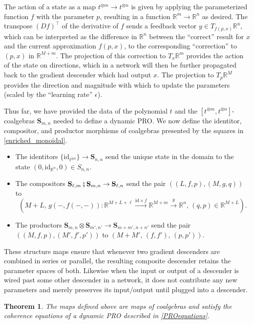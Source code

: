 \documentclass[11pt, one side, article]{memoir}
\theoremstyle{definition}
\theoremstyle{plain}
\newtheorem{theorem}[definitionx]{Theorem}
\newcommand{\Cat}[1]{\mathbf{#1}}%
\newcommand{\id}{\mathrm{id}}
\newcommand{\then}{\mathbin{\fatsemi}}
\newcommand{\To}[2][]{\xrightarrow[#1]{#2}}
\newcommand{\rr}{\mathbb{R}}
\newcommand{\0}{\textsf{0}}
\newcommand{\1}{\tn{\textsf{1}}}
\renewcommand{\S}{{\Cat{S}}}
\newcommand{\idcoalg}[1]{{\{\id_{#1}\}}}
\begin{document}
The action of a state as a map $t^{\otimes m} \to t^{\otimes n}$ is given by applying the parameterized function $f$ with the parameter $p$, resulting in a function $\rr^m \to \rr^n$ as desired. The transpose $(Df)^\top$ of the derivative of $f$ sends a feedback vector $y \in T_{f(p,x)} \rr^n$, which can be interpreted as the difference in $\rr^n$ between the ``correct'' result for $x$ and the current approximation $f(p,x)$, to the corresponding ``correction'' to $(p,x)$ in $\rr^{M+m}$. The projection of this correction to $T_x \rr^m$ provides the action of the state on directions, which in a network will then be further propagated back to the gradient descender which had output $x$. The projection to $T_p \rr^M$ provides the direction and magnitude with which to update the parameters (scaled by the ``learning rate'' $\epsilon$).

Thus far, we have provided the data of the polynomial $t$ and the $[t^{\otimes m},t^{\otimes n}]$-coalgebras $\S_{m,n}$ needed to define a dynamic PRO. We now define the identitor, compositor, and productor morphisms of coalgebras presented by the squares in \cref{enriched_monoidal}.
\begin{itemize}
	\item The identitors $\idcoalg{t^{\otimes n}} \to \S_{n,n}$ send the unique state in the domain to the state $(0,\id_{\rr^n},0) \in S_{n,n}$. 
	\item The compositors $\S_{\ell,m}\then\S_{m,n} \to \S_{\ell,n}$ send the pair $((L,f,p),(M,g,q))$ to 
\[\left( M+L,\,g(-,f(-,-))\colon \rr^{M+L+\ell} \To{\id \times f} \rr^{M+m} \To{g} \rr^n,\, (q,p) \in \rr^{M+L} \right).\]
	\item The productors $\S_{m,n} \otimes \S_{m',n'} \to \S_{m+m',n+n'}$ send the pair $((M,f,p),(M',f',p'))$ to $(M+M',\,(f,f'),\,(p,p'))$.
\end{itemize}

These structure maps ensure that whenever two gradient descenders are combined in series or parallel, the resulting composite descender retains the parameter spaces of both. Likewise when the input or output of a descender is wired past some other descender in a network, it does not contribute any new parameters and merely preserves its input/output until plugged into a descender.

\begin{theorem}\label{gradientadaptive}
The maps defined above are maps of coalgebras and satisfy the coherence equations of a dynamic PRO described in \cref{PROequations}.%
\end{theorem}
\end{document}
